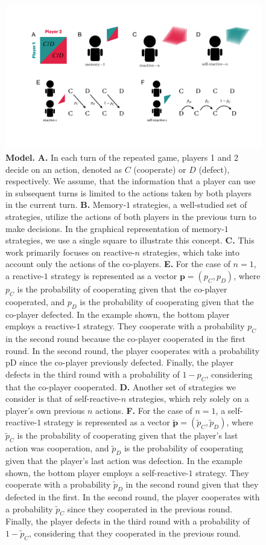 \documentclass{article}
\theoremstyle{definition}
\begin{document}
\begin{figure}[h!]
  \centering
  \includegraphics[width=\textwidth]{figures/conceptual_figure_model.pdf}
  \caption{\textbf{Model.}
  \textbf{A.} In each turn of the repeated game, players 1 and 2 decide on an action,
  denoted as $C$ (cooperate) or $D$ (defect), respectively. We assume, that the information that a
  player can use in subsequent turns is limited to the actions taken by both
  players in the current turn.
  \textbf{B.} Memory-$1$ strategies, a well-studied set of strategies, utilize the
  actions of both players in the previous turn to make decisions. In the graphical
  representation of memory-$1$ strategies, we use a single square to illustrate this
  concept.
  \textbf{C.} This work primarily focuses on reactive-$n$ strategies, which take
  into account only the actions of the co-players.
  \textbf{E.} For the case of $n = 1$, a reactive-$1$ strategy is represented as a vector $\mathbf{p} =
  (p_C, p_D)$, where $p_C$ is the probability of cooperating given that the co-player
  cooperated, and $p_D$ is the probability of cooperating given that the co-player
  defected. In the example shown, the bottom player employs a reactive-$1$ strategy.
  They cooperate with a probability $p_C$ in the second round because the co-player
  cooperated in the first round. In the second round, the player cooperates with a
  probability pD since the co-player previously defected. Finally, the player
  defects in the third round with a probability of $1 - p_C$, considering that the
  co-player cooperated.
  \textbf{D.} Another set of strategies we consider is that of self-reactive-$n$
  strategies, which rely solely on a player's own previous $n$ actions.
  \textbf{F.} For the case of $n = 1$, a self-reactive-$1$ strategy is represented
  as a vector $\mathbf{\tilde{p}} = (\tilde{p}_C, \tilde{p}_D)$, where
  $\tilde{p}_C$ is the probability of cooperating given that the player's last
  action was cooperation, and $\tilde{p}_D$ is the probability of cooperating
  given that the player's last action was defection. In the example shown, the
  bottom player employs a self-reactive-$1$ strategy. They cooperate with a
  probability $\tilde{p}_D$ in the second round given that they defected in the
  first. In the second round, the player cooperates with a probability
  $\tilde{p}_C$ since they cooperated in the previous round. Finally, the player
  defects in the third round with a probability of $1 - \tilde{p}_C$, considering
  that they cooperated in the previous round.}
\end{figure}
\end{document}
